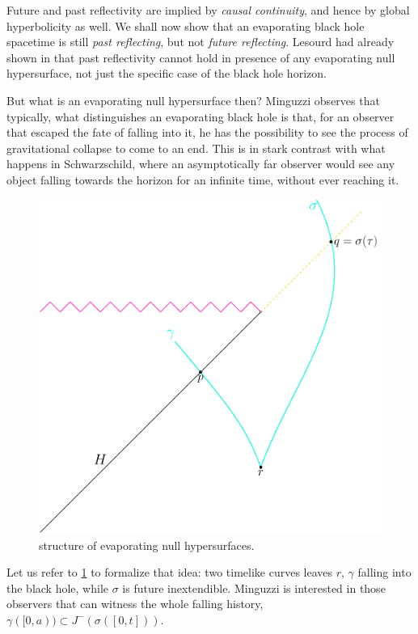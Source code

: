 	Future and past reflectivity are implied by \emph{causal continuity}, and hence by global hyperbolicity as well. We shall now show that an evaporating black hole spacetime is still \emph{past reflecting}, but not \emph{future reflecting}. Lesourd had already shown in \cite[]{lesourd2018causal} that past reflectivity cannot hold in presence of any evaporating null hypersurface, not just the specific case of the black hole horizon. 

	But what is an evaporating null hypersurface then? Minguzzi observes that typically, what distinguishes an evaporating black hole is that, for an observer that escaped the fate of falling into it, he has the possibility to see the process of gravitational collapse to come to an end. This is in stark contrast with what happens in Schwarzschild, where an asymptotically far observer would see any object falling towards the horizon for an infinite time, without ever reaching it.

	\begin{figure}
		\centering
		\includegraphics[scale=0.5]{Immagini/evaporating-surfaces/evaporating-surfaces.pdf}
		\caption{structure of evaporating null hypersurfaces.}
		\label{fig:evaporating-surface}
	\end{figure}

	Let us refer to \ref{fig:evaporating-surface} to formalize that idea: two timelike curves leaves \(r\), \(\gamma\) falling into the black hole, while \(\sigma\) is future inextendible. Minguzzi is interested in those observers that can witness the whole falling history, \(\gamma ([0,a)) \subset J^-(\sigma([0,t]))\).

